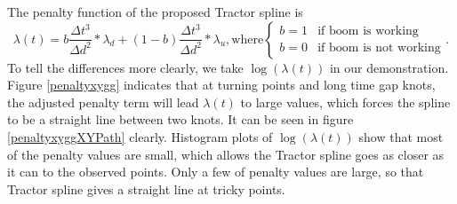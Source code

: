 The penalty function of the proposed Tractor spline is
\begin{equation}\label{penaltylamb}
\lambda(t)=b\frac{\Delta t^3}{\Delta d^2}*\lambda_d+(1-b)\frac{\Delta t^3}{\Delta d^2}*\lambda_u, \mbox{where}
\begin{cases}
b=1 & \mbox{if boom is working}\\
b=0 & \mbox{if boom is not working}
\end{cases}.
\end{equation}
To tell the differences more clearly, we take $\log(\lambda(t))$ in our demonstration. Figure \ref{penaltyxygg} indicates that at turning points and long time gap knots, the adjusted penalty term will lead $\lambda(t)$ to large values, which forces the spline to be a straight line between two knots. It can be seen in figure \ref{penaltyxyggXYPath} clearly. Histogram plots of $\log(\lambda(t))$ show that most of the penalty values are small, which allows the Tractor spline goes as closer as it can to the observed points. Only a few of penalty values are large, so that Tractor spline gives a straight line at tricky points. 


